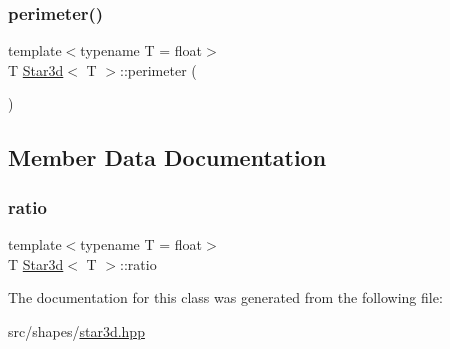 \mbox{\label{classStar3d_aac560f44b7b7d278781231fbaf8312e1}} 
\subsubsection{\texorpdfstring{perimeter()}{perimeter()}}
{\footnotesize\ttfamily template$<$typename T  = float$>$ \\
T \mbox{\hyperlink{classStar3d}{Star3d}}$<$ T $>$\+::perimeter (\begin{DoxyParamCaption}{ }\end{DoxyParamCaption})}



\subsection{Member Data Documentation}
\mbox{\label{classStar3d_a4c2be78d1baa7a423885cc3574591848}} 
\subsubsection{\texorpdfstring{ratio}{ratio}}
{\footnotesize\ttfamily template$<$typename T  = float$>$ \\
T \mbox{\hyperlink{classStar3d}{Star3d}}$<$ T $>$\+::ratio}



The documentation for this class was generated from the following file\+:\begin{DoxyCompactItemize}
\item 
src/shapes/\mbox{\hyperlink{star3d_8hpp}{star3d.\+hpp}}\end{DoxyCompactItemize}
